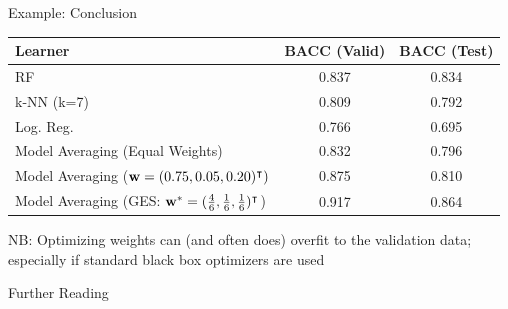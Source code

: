 \documentclass[11pt,compress,t,notes=noshow, aspectratio=169, xcolor=table]{beamer}
\begin{document}
\begin{vbframe}{Example: Conclusion}
\begin{table}[h]
\centering
\begin{tabular}{lcc}
\hline
\textbf{Learner} & \textbf{BACC} (Valid) & \textbf{BACC} (Test) \\
\hline
RF & 0.837 & 0.834 \\
k-NN (k=7) & 0.809 & 0.792 \\
Log. Reg. & 0.766 & 0.695 \\
Model Averaging (Equal Weights) & 0.832 & 0.796 \\
Model Averaging ($\mathbf{w} = (0.75, 0.05, 0.20)^\intercal)$ & 0.875 & 0.810 \\
Model Averaging (GES: $\mathbf{w}^{*} = (\frac{4}{6}, \frac{1}{6}, \frac{1}{6})^\intercal$) & 0.917 & 0.864\\
\hline
\end{tabular}
\label{table:learners_valid_test}
\end{table}
\vspace{1em}
NB: Optimizing weights can (and often does) overfit to the validation data; especially if standard black box optimizers are used\\
\end{vbframe}


\begin{vbframe}{Further Reading}
\end{vbframe}



\endlecture
\end{document}
